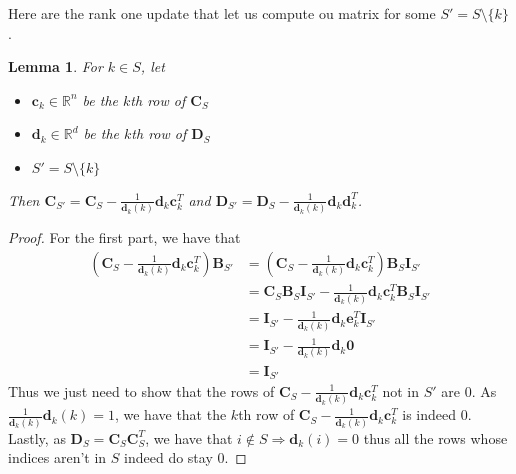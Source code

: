 \documentclass[12pt]{article}
\newtheorem{lemma}[theorem]{Lemma}
\begin{document}
Here are the rank one update that let us compute ou matrix for some $S'=S\setminus\{k\}$.
\begin{lemma}\label{update_lemma}
For $k\in S$, let 
\begin{itemize}
\item $\textbf{c}_k\in\mathbb{R}^{n}$ be the $k$th row of $\textbf{C}_S$
\item $\textbf{d}_k\in\mathbb{R}^{d}$ be the $k$th row of $\textbf{D}_S$
\item $S'= S\setminus\{k\}$
\end{itemize}
Then $\textbf{C}_{S'}=\textbf{C}_S-\frac{1}{\textbf{d}_k(k)}\textbf{d}_k\textbf{c}_k^T$ and $\textbf{D}_{S'}=\textbf{D}_S-\frac{1}{\textbf{d}_k(k)}\textbf{d}_k\textbf{d}_k^T$.
\end{lemma}
\begin{proof}
For the first part, we have that\begin{align*}
\left(\textbf{C}_S-\frac{1}{\textbf{d}_k(k)}\textbf{d}_k\textbf{c}_k^T\right)\textbf{B}_{S'}&=\left(\textbf{C}_S-\frac{1}{\textbf{d}_k(k)}\textbf{d}_k\textbf{c}_k^T\right)\textbf{B}_{S}\textbf{I}_{S'}\\
&=\textbf{C}_S\textbf{B}_S\textbf{I}_{S'}-\frac{1}{\textbf{d}_k(k)}\textbf{d}_k\textbf{c}_k^T\textbf{B}_{S}\textbf{I}_{S'}\\
&=\textbf{I}_{S'}-\frac{1}{\textbf{d}_k(k)}\textbf{d}_k\textbf{e}_k^T\textbf{I}_{S'}\\
&=\textbf{I}_{S'}-\frac{1}{\textbf{d}_k(k)}\textbf{d}_k\textbf{0}\\
&=\textbf{I}_{S'}\end{align*}
Thus we just need to show that the rows of $\textbf{C}_S-\frac{1}{\textbf{d}_k(k)}\textbf{d}_k\textbf{c}_k^T$ not in $S'$ are 0. As $\frac{1}{\textbf{d}_k(k)}\textbf{d}_k(k)=1$, we have that the $k$th row of $\textbf{C}_S-\frac{1}{\textbf{d}_k(k)}\textbf{d}_k\textbf{c}_k^T$ is indeed 0. Lastly, as $\textbf{D}_S=\textbf{C}_S\textbf{C}_S^T$, we have that $i\not\in S\Rightarrow \textbf{d}_k(i)=0$ thus all the rows whose indices aren't in $S$ indeed do stay 0.


\end{proof}
\end{document}
